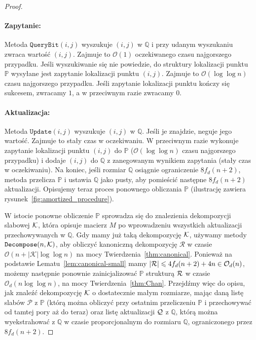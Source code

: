 \documentclass[runningheads]{llncs}
\newcommand{\Oh}{\mathcal{O}}
\renewcommand{\leq}{\leqslant}
\begin{document}
\begin{proof}
\paragraph*{Zapytanie:}
Metoda $\mathtt{QueryBit}(i,j)$ wyszukuje $(i,j)$ w $\mathbb{Q}$
i przy udanym wyszukaniu zwraca wartość $(i,j)$.
Zajmuje to $\Oh(1)$ oczekiwanego czasu najgorszego przypadku.
Jeśli wyszukiwanie się nie powiedzie, do
struktury lokalizacji punktu $\mathbb{P}$ wysyłane jest zapytanie lokalizacji punktu $(i,j)$. Zajmuje to
$\Oh(\log \log n)$ czasu najgorszego przypadku. Jeśli zapytanie lokalizacji punktu
kończy się sukcesem, zwracamy $1$, a w przeciwnym razie zwracamy $0$.

\paragraph*{Aktualizacja:}
Metoda $\mathtt{Update}(i, j)$ wyszukuje $(i,j)$ w
$\mathbb{Q}$. Jeśli je znajdzie, neguje jego wartość.
Zajmuje to stały czas w oczekiwaniu.
W przeciwnym razie wykonuje zapytanie lokalizacji punktu $(i,j)$ do $\mathbb{P}$
($\Oh(\log \log n)$ czasu najgorszego przypadku)
i dodaje $(i,j)$ do $\mathbb{Q}$ z zanegowanym wynikiem zapytania
(stały czas w oczekiwaniu).
Na koniec,
jeśli rozmiar $\mathbb{Q}$ osiągnie ograniczenie $8 f_d(n+2)$,
metoda
przelicza $\mathbb{P}$ i ustawia $\mathbb{Q}$ jako pusty, aby
pomieścić następne $8 f_d(n+2)$ aktualizacji.
Opisujemy teraz proces ponownego obliczania $\mathbb{P}$ (ilustrację zawiera rysunek~\ref{fig:amortized_procedure}).

W istocie ponowne obliczenie $\mathbb{P}$ sprowadza się do znalezienia
dekompozycji slabowej $\cal K$, która opisuje
macierz $M$ po wprowadzeniu wszystkich aktualizacji przechowywanych w $\mathbb{Q}$.
Gdy mamy już taką dekompozycję $\cal K$,
używamy metody $\mathtt{Decompose}(n,\cal K)$, aby obliczyć
kanoniczną dekompozycję $\mathcal{R}$ w czasie
$\Oh(n+|\mathcal{K}| \log \log n)$ na mocy
Twierdzenia~\ref{thm:canonical}. Ponieważ na podstawie Lematu~\ref{lem:canonical-small} mamy $|{\cal R}|\leq 4 f_d(n+2)+4n \in \Oh_d(n)$, możemy następnie ponownie zainicjalizować $\mathbb{P}$ strukturą ${\cal R}$
w czasie $\Oh_d(n \log \log n)$, na mocy Twierdzenia~\ref{thm:Chan}.
Przejdźmy więc do opisu, jak znaleźć dekompozycję
$\cal K$ o dostatecznie małym rozmiarze, mając daną listę slabów $\mathcal{P}$
z $\mathbb{P}$ (którą można obliczyć przy ostatnim przeliczeniu
$\mathbb{P}$ i przechowywać od tamtej pory aż do teraz) oraz listę
aktualizacji $\cal Q$ z $\mathbb{Q}$, którą można wyekstrahować z
$\mathbb{Q}$ w czasie proporcjonalnym do rozmiaru $\mathbb{Q}$,
ograniczonego przez $8 f_d(n+2)$.


\end{proof}
\end{document}
